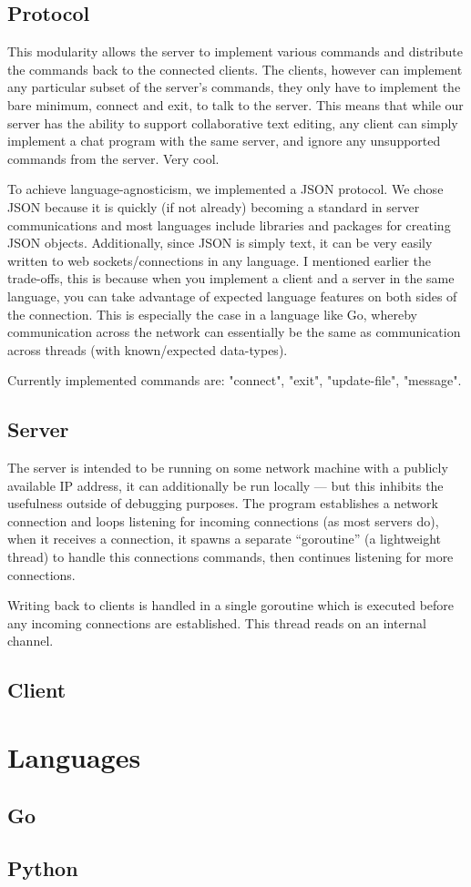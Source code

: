\documentclass[10pt, letterpaper]{article}
\begin{document}
\subsection*{Protocol}

This modularity allows the server to implement various commands and 
distribute the commands back to the connected clients. The clients, however 
can implement any particular subset of the server's commands, they only have 
to implement the bare minimum, connect and exit, to talk to the server. This 
means that while our server has the ability to support collaborative text 
editing, any client can simply implement a chat program with the same server, 
and ignore any unsupported commands from the server. Very cool.

To achieve language-agnosticism, we implemented a JSON protocol. We chose 
JSON because it is quickly (if not already) becoming a standard in server 
communications and most languages include libraries and packages for creating 
JSON objects. Additionally, since JSON is simply text, it can be very easily 
written to web sockets/connections in any language. I mentioned earlier the 
trade-offs, this is because when you implement a client and a server in the 
same language, you can take advantage of expected language features on both 
sides of the connection. This is especially the case in a language like Go, 
whereby communication across the network can essentially be the same as 
communication across threads (with known/expected data-types).

Currently implemented commands are: "connect", "exit", "update-file", 
"message".

\subsection*{Server}

The server is intended to be running on some network machine with a publicly 
available IP address, it can additionally be run locally --- but this inhibits 
the usefulness outside of debugging purposes. The program establishes a 
network connection and loops listening for incoming connections (as most 
servers do), when it receives a connection, it spawns a separate ``goroutine'' 
(a lightweight thread) to handle this connections commands, then continues 
listening for more connections.

Writing back to clients is handled in a single goroutine which is executed 
before any incoming connections are established. This thread reads on an 
internal channel.

\subsection*{Client}

\section*{Languages}

\subsection*{Go}

\subsection*{Python}
\end{document}
